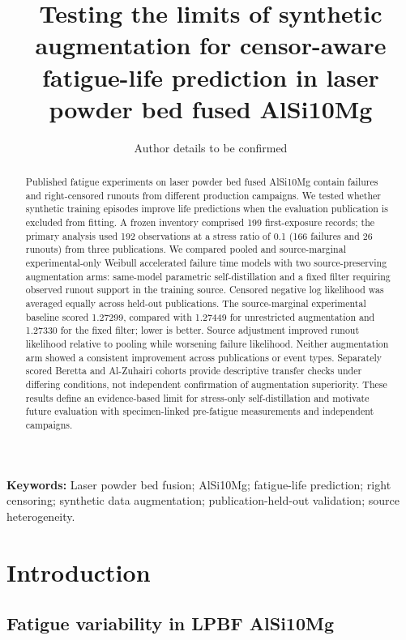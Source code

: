 \documentclass[12pt,a4paper]{article}
\title{Testing the limits of synthetic augmentation for censor-aware fatigue-life prediction in laser powder bed fused AlSi10Mg}
\author{Author details to be confirmed}
\date{}
\begin{document}
\maketitle



\begin{abstract}
Published fatigue experiments on laser powder bed fused AlSi10Mg contain failures and right-censored runouts from different production campaigns. We tested whether synthetic training episodes improve life predictions when the evaluation publication is excluded from fitting. A frozen inventory comprised 199 first-exposure records; the primary analysis used 192 observations at a stress ratio of 0.1 (166 failures and 26 runouts) from three publications. We compared pooled and source-marginal experimental-only Weibull accelerated failure time models with two source-preserving augmentation arms: same-model parametric self-distillation and a fixed filter requiring observed runout support in the training source. Censored negative log likelihood was averaged equally across held-out publications. The source-marginal experimental baseline scored 1.27299, compared with 1.27449 for unrestricted augmentation and 1.27330 for the fixed filter; lower is better. Source adjustment improved runout likelihood relative to pooling while worsening failure likelihood. Neither augmentation arm showed a consistent improvement across publications or event types. Separately scored Beretta and Al-Zuhairi cohorts provide descriptive transfer checks under differing conditions, not independent confirmation of augmentation superiority. These results define an evidence-based limit for stress-only self-distillation and motivate future evaluation with specimen-linked pre-fatigue measurements and independent campaigns.
\end{abstract}
\noindent\textbf{Keywords:} Laser powder bed fusion; AlSi10Mg; fatigue-life prediction; right censoring; synthetic data augmentation; publication-held-out validation; source heterogeneity.\par
\section{Introduction}

\subsection{Fatigue variability in LPBF AlSi10Mg}
\end{document}
